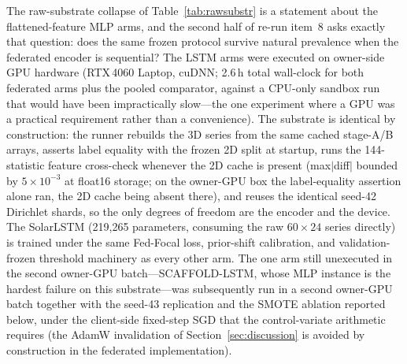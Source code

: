 The raw-substrate collapse of Table~\ref{tab:rawsubstr} is a
statement about the flattened-feature MLP arms, and the second half of
re-run item~8 asks exactly that question: does the same frozen
protocol survive natural prevalence when the federated encoder is
sequential? The LSTM arms were executed on owner-side GPU hardware
(RTX\,4060 Laptop, cuDNN; 2.6\,h total wall-clock for both
federated arms plus the pooled comparator, against a CPU-only
sandbox run that would have been impractically slow---the one experiment where a GPU was a
practical requirement rather than a convenience). The
substrate is identical by construction: the runner rebuilds the 3D
series from the same cached stage-A/B arrays, asserts label equality
with the frozen 2D split at startup, runs the 144-statistic feature
cross-check whenever the 2D cache is present (max$|$diff$|$ bounded
by $5\times10^{-3}$ at float16 storage; on the owner-GPU box the
label-equality assertion alone ran, the 2D cache being absent
there), and reuses the
identical seed-42 Dirichlet shards, so the only degrees of freedom
are the encoder and the device. The SolarLSTM (219,265 parameters,
consuming the raw $60\times24$ series directly) is trained under the
same Fed-Focal loss, prior-shift calibration, and validation-frozen
threshold machinery as every other arm. The one arm still unexecuted
in the second owner-GPU batch---SCAFFOLD-LSTM, whose MLP instance is the hardest failure
on this substrate---was subsequently run in a second owner-GPU batch
together with the seed-43 replication and the SMOTE ablation
reported below, under the client-side fixed-step SGD that the
control-variate arithmetic requires (the AdamW invalidation of
Section~\ref{sec:discussion} is avoided by construction in the
federated implementation).

